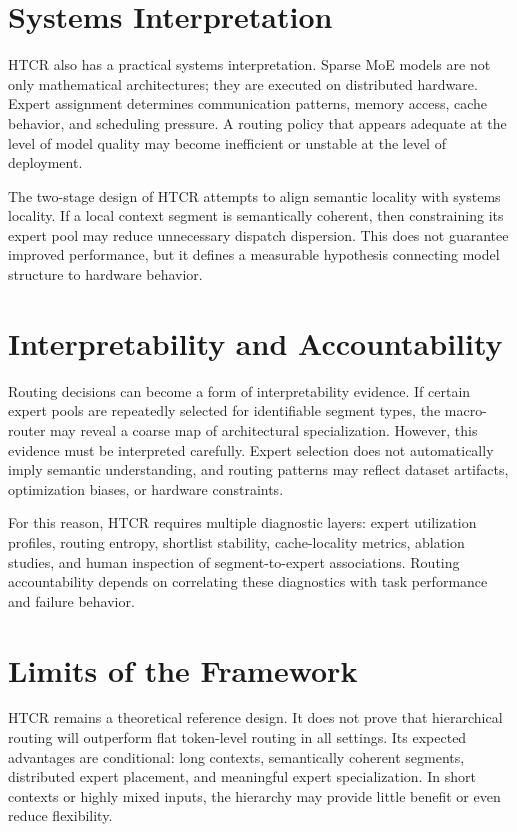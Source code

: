 \section{Systems Interpretation}

HTCR also has a practical systems interpretation. Sparse MoE models are not only mathematical architectures; they are executed on distributed hardware. Expert assignment determines communication patterns, memory access, cache behavior, and scheduling pressure. A routing policy that appears adequate at the level of model quality may become inefficient or unstable at the level of deployment.

The two-stage design of HTCR attempts to align semantic locality with systems locality. If a local context segment is semantically coherent, then constraining its expert pool may reduce unnecessary dispatch dispersion. This does not guarantee improved performance, but it defines a measurable hypothesis connecting model structure to hardware behavior.

\section{Interpretability and Accountability}

Routing decisions can become a form of interpretability evidence. If certain expert pools are repeatedly selected for identifiable segment types, the macro-router may reveal a coarse map of architectural specialization. However, this evidence must be interpreted carefully. Expert selection does not automatically imply semantic understanding, and routing patterns may reflect dataset artifacts, optimization biases, or hardware constraints.

For this reason, HTCR requires multiple diagnostic layers: expert utilization profiles, routing entropy, shortlist stability, cache-locality metrics, ablation studies, and human inspection of segment-to-expert associations. Routing accountability depends on correlating these diagnostics with task performance and failure behavior.

\section{Limits of the Framework}

HTCR remains a theoretical reference design. It does not prove that hierarchical routing will outperform flat token-level routing in all settings. Its expected advantages are conditional: long contexts, semantically coherent segments, distributed expert placement, and meaningful expert specialization. In short contexts or highly mixed inputs, the hierarchy may provide little benefit or even reduce flexibility.

